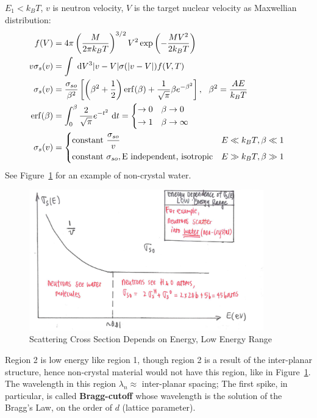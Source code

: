 \documentclass{school-22.101-notes}
\begin{document}
$E_1 < k_B T$, $v$ is neutron velocity, $V$ is the target nuclear velocity as Maxwellian distribution:
\begin{align}
f(V) &= 4 \pi \left( \frac{M}{2 \pi k_B T} \right)^{3/2} V^2 \exp \left( - \frac{MV^2}{2 k_B T} \right) \\
v \sigma_s (v) &= \int \dV^3 |v-V| \sigma(|v-V|) f(V,T) \\
\sigma_s(v) &= \frac{\sigma_{so}}{\beta^2} \left[ \left(\beta^2 + \frac{1}{2} \right) \mathrm{erf}(\beta) + \frac{1}{\sqrt{\pi}} \beta e^{-\beta^2} \right], \fsp \fsp \beta^2 = \frac{A E}{k_B T}\\
\mathrm{erf}(\beta) &= \int_0^{\beta} \frac{2}{\sqrt{\pi}} e^{-t^2} \dt = 
\begin{dcases*}
\to 0 & $\beta \to 0$ \\
\to 1 & $\beta \to \infty$ 
\end{dcases*} \\
\sigma_s (v) &= 
\begin{dcases*}
\mbox{constant } \frac{\sigma_{so}}{v}& $E \ll k_B T, \beta \ll 1$ \\
\mbox{constant } \sigma_{so}, \mbox{E independent, isotropic} & $E \gg k_B T, \beta \gg 1$ 
\end{dcases*} 
\end{align}
See Figure~\ref{sigma-vs-T-low-energy} for an example of non-crystal water. 
\begin{figure}
    \centering
    \includegraphics[width=4in]{images/ni/sigma-vs-T-low-energy.png}
    \caption{Scattering Cross Section Depends on Energy, Low Energy Range\label{sigma-vs-T-low-energy}}
\end{figure}

Region 2 is low energy like region 1, though region 2 is a result of the inter-planar structure, hence non-crystal material would not have this region, like in Figure~\ref{sigma-vs-T-low-energy}. The wavelength in this region $\lambda_n \approx$ inter-planar spacing; The first spike, in particular, is called \textbf{Bragg-cutoff} whose wavelength is the solution of the Bragg's Law, on the order of $d$ (lattice parameter). 
\end{document}
